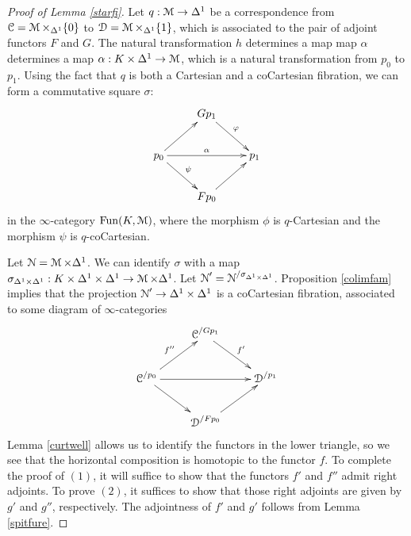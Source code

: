 \begin{proof}[Proof of Lemma \ref{starfi}]
Let $q: \operatorname{\mathcal{M}} \rightarrow \Delta^1$ be a correspondence from $\operatorname{\mathcal{C}} = 
\operatorname{\mathcal{M}} \times_{\Delta^1} \{0\}$ to
$\operatorname{\mathcal{D}} = \operatorname{\mathcal{M}} \times_{\Delta^1} \{1\}$, which is associated to the pair of adjoint functors $F$ and $G$.
The natural transformation $h$ determines a map
map $\alpha$ determines a map
$\alpha: K \times \Delta^1 \rightarrow \operatorname{\mathcal{M}}$, which is a natural 
transformation from $p_0$ to $p_1$. Using the fact that $q$ is both a 
Cartesian and a coCartesian fibration, we can form a commutative
square $\sigma$:
$$ \xymatrix{ & Gp_1 \ar[dr]^{\phi} & \\
p_0 \ar[ur] \ar[rr]^{\alpha} \ar[dr]^{\psi} & & p_1 \\
& Fp_0 \ar[ur] & }$$
in the $\infty$-category $\operatorname{Fun}(K, \operatorname{\mathcal{M}})$, where the morphism $\phi$ is
$q$-Cartesian and the morphism $\psi$ is $q$-coCartesian.

Let $\operatorname{\mathcal{N}} = \operatorname{\mathcal{M}} \times \Delta^1$. We can identify $\sigma$ with a map
$\sigma_{\Delta^1 \times \Delta^1}: K \times \Delta^1 \times \Delta^1 
\rightarrow \operatorname{\mathcal{M}} \times \Delta^1$. Let $\operatorname{\mathcal{N}}' = \operatorname{\mathcal{N}}^{/ 
\sigma_{\Delta^1 \times \Delta^1}}$. Proposition \ref{colimfam} 
implies that the projection $\operatorname{\mathcal{N}}' \rightarrow \Delta^1 \times \Delta^1$ 
is a coCartesian fibration, associated to some diagram of 
$\infty$-categories
$$ \xymatrix{ & \calC^{/Gp_1} \ar[dr]^{f'} & \\
\calC^{/p_0} \ar[rr] \ar[dr] \ar[ur]^{f''} & & \calD^{/p_1} \\
& \calD^{/Fp_0} \ar[ur]. & }$$
Lemma \ref{curtwell} allows us to identify the functors in the lower 
triangle, so we see that the horizontal composition is homotopic to the 
functor $f$. To complete the proof of $(1)$, it will suffice to show that
the functors $f'$ and $f''$ admit right adjoints. To prove $(2)$, it 
suffices to show that those right adjoints are given by $g'$ and $g''$, 
respectively. The adjointness of $f'$ and $g'$ follows from Lemma 
\ref{spitfure}.


\end{proof}
